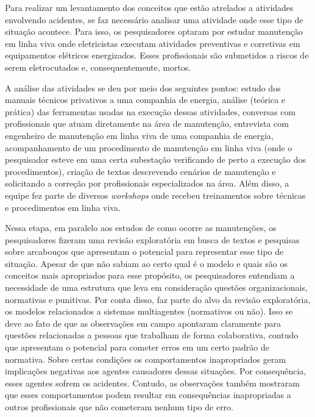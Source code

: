 Para realizar um levantamento dos conceitos que estão atrelados a atividades envolvendo acidentes, se faz necessário analisar uma atividade onde esse tipo de situação acontece. Para isso, os pesquisadores optaram por estudar manutenção em linha viva onde eletricistas executam atividades preventivas e corretivas em equipamentos elétricos energizados. Esses profissionais são submetidos a riscos de serem eletrocutados e, consequentemente, mortos. 

A análise das atividades se deu por meio dos seguintes pontos: estudo dos manuais técnicos privativos a uma companhia de energia, análise (teórica e prática) das ferramentas usadas na execução dessas atividades, conversas com profissionais que atuam diretamente na área de manutenção, entrevista com engenheiro de manutenção em linha viva de uma companhia de energia, acompanhamento de um procedimento de manutenção em linha viva (onde o pesquisador esteve em uma certa subestação verificando de perto a execução dos procedimentos), criação de textos descrevendo cenários de manutenção e solicitando a correção por profissionais especializados na área. Além disso, a equipe fez parte de diversos \textit{workshops} onde recebeu treinamentos sobre técnicas e procedimentos em linha viva. 

Nessa etapa, em paralelo aos estudos de como ocorre as manutenções, os pesquisadores fizeram uma revisão exploratória em busca de textos e pesquisas sobre arcabouços que apresentam o potencial para representar esse tipo de situação. Apesar de que não sabiam ao certo qual é o modelo e quais são os conceitos mais apropriados para esse propósito, os pesquisadores entendiam a necessidade de uma estrutura que leva em consideração questões organizacionais, normativas e punitivas. Por conta disso, faz parte do alvo da revisão exploratória, os modelos relacionados a sistemas multiagentes (normativos ou não). Isso se deve ao fato de que as observações em campo apontaram claramente para questões relacionadas a pessoas que trabalham de forma colaborativa, contudo que apresentam o potencial para cometer erros em um certo padrão de normativa. Sobre certas condições os comportamentos inapropriados geram implicações negativas aos agentes causadores dessas situações. Por consequência, esses agentes sofrem os acidentes. Contudo, as observações também mostraram que esses comportamentos podem resultar em consequências inapropriadas a outros profissionais que não cometeram nenhum tipo de erro.